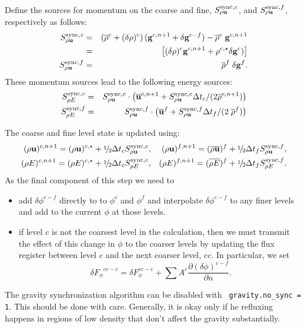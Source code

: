 \begin{itemize}
Define the \sync sources for momentum on the coarse and fine, $S^{{\rm sync},c}_{\rho {\bf u}}$, and
$S^{{\rm sync},f}_{\rho {\bf u}}$, respectively as follows:
\begin{eqnarray}
S^{{\rm sync},c}_{\rho {\bf u}} &=& \left(
        \overline{\rho}^c + (\delta \rho)^c \right) ({\bf g}^{c,n+1} + \delta {\bf g}^{c-f}) -
        \overline{\rho}^c                 \; {\bf g}^{c,n+1} \nonumber \\
           &=& \left[( \delta \rho)^c {\bf g}^{c,n+1} + 
                \rho^{c,\star} \delta {\bf g}^c)  \right ] \\
S^{{\rm sync},f}_{\rho {\bf u}} &=& \overline{\rho}^{f} \; \delta {\bf g}^f  .
\end{eqnarray}
These momentum sources lead to the following energy sources:
\begin{eqnarray}
S^{{\rm sync},c}_{\rho E} &=& S^{{\rm sync},c}_{\rho {\bf u}} \cdot
         \left(   \overline{{\bf u}}^{c,n+1} + S^{{\rm sync},c}_{\rho {\bf u}} \Delta t_c / (2 \overline{\rho}^{c,n+1}) \right) \\
S^{{\rm sync},f}_{\rho E} &=& S^{{\rm sync},f}_{\rho {\bf u}} \cdot
         \left(
    \overline{{\bf u}}^{f} + S^{{\rm sync},f}_{\rho {\bf u}} \Delta t_f / (2 \; \overline{\rho}^{f} )
         \right)
\end{eqnarray}

The coarse and fine level state is updated using:
\begin{eqnarray}
(\rho \ub)^{c,n+1} =  (\rho \ub)^{c, \star } + \myhalf \Delta t_c S^{\sync,c}_{\rho \ub} ,&&
(\rho \ub)^{f,n+1} =  (\overline{\rho \ub})^{f} + \myhalf \Delta t_f S^{\sync,f}_{\rho \ub},  \\
(\rho E)^{c,n+1} =  (\rho E)^{c, \star } + \myhalf \Delta t_c S^{\sync,c}_{\rho E} ,&&
(\rho E)^{f,n+1} =  (\overline{\rho E})^{f} + \myhalf \Delta t_f S^{\sync,f}_{\rho E}  .
\end{eqnarray}
As the final component of this step we need to 
\begin{itemize}
\item add $\delta \phi^{c-f}$ directly to 
to $\phi^{c}$ and $\phi^{f}$ and interpolate $\delta \phi^{c-f}$ to any finer
levels and add to the current $\phi$ at those levels.

\item if level $c$ is not the coarsest level in the calculation, then we must transmit the
effect of this change in $\phi$ to the coarser levels by updating the flux register between
level $c$ and the next coarser level, $cc.$ In particular, we set
\begin{equation}
\delta {F_\phi}^{cc-c} = \delta F_\phi^{cc-c} 
+ \sum A^c \frac{\partial (\delta \phi)^{c-f}}{\partial n}  .
\end{equation}
\end{itemize}

The gravity synchronization algorithm can be disabled with {\tt
  gravity.no\_sync = 1}.  This should be done with care.  Generally,
it is okay only if he refluxing happens in regions of low density that
don't affect the gravity substantially.

\end{itemize}
